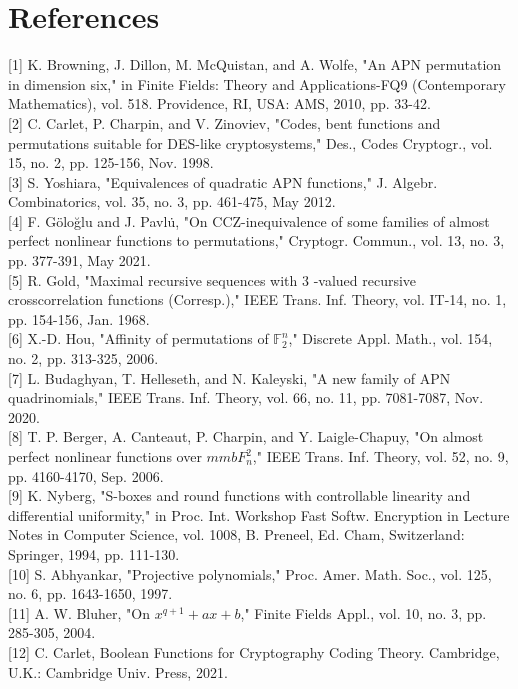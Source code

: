 \documentclass[10pt]{article}
\begin{document}
\section*{References}
[1] K. Browning, J. Dillon, M. McQuistan, and A. Wolfe, "An APN permutation in dimension six," in Finite Fields: Theory and Applications-FQ9 (Contemporary Mathematics), vol. 518. Providence, RI, USA: AMS, 2010, pp. 33-42.\\[0pt]
[2] C. Carlet, P. Charpin, and V. Zinoviev, "Codes, bent functions and permutations suitable for DES-like cryptosystems," Des., Codes Cryptogr., vol. 15, no. 2, pp. 125-156, Nov. 1998.\\[0pt]
[3] S. Yoshiara, "Equivalences of quadratic APN functions," J. Algebr. Combinatorics, vol. 35, no. 3, pp. 461-475, May 2012.\\[0pt]
[4] F. Göloğlu and J. Pavlu̇, "On CCZ-inequivalence of some families of almost perfect nonlinear functions to permutations," Cryptogr. Commun., vol. 13, no. 3, pp. 377-391, May 2021.\\[0pt]
[5] R. Gold, "Maximal recursive sequences with 3 -valued recursive crosscorrelation functions (Corresp.)," IEEE Trans. Inf. Theory, vol. IT-14, no. 1, pp. 154-156, Jan. 1968.\\[0pt]
[6] X.-D. Hou, "Affinity of permutations of $\mathbb{F}_{2}^{n}$," Discrete Appl. Math., vol. 154, no. 2, pp. 313-325, 2006.\\[0pt]
[7] L. Budaghyan, T. Helleseth, and N. Kaleyski, "A new family of APN quadrinomials," IEEE Trans. Inf. Theory, vol. 66, no. 11, pp. 7081-7087, Nov. 2020.\\[0pt]
[8] T. P. Berger, A. Canteaut, P. Charpin, and Y. Laigle-Chapuy, "On almost perfect nonlinear functions over $m m b F_{n}^{2}$," IEEE Trans. Inf. Theory, vol. 52, no. 9, pp. 4160-4170, Sep. 2006.\\[0pt]
[9] K. Nyberg, "S-boxes and round functions with controllable linearity and differential uniformity," in Proc. Int. Workshop Fast Softw. Encryption in Lecture Notes in Computer Science, vol. 1008, B. Preneel, Ed. Cham, Switzerland: Springer, 1994, pp. 111-130.\\[0pt]
[10] S. Abhyankar, "Projective polynomials," Proc. Amer. Math. Soc., vol. 125, no. 6, pp. 1643-1650, 1997.\\[0pt]
[11] A. W. Bluher, "On $x^{q+1}+a x+b$," Finite Fields Appl., vol. 10, no. 3, pp. 285-305, 2004.\\[0pt]
[12] C. Carlet, Boolean Functions for Cryptography Coding Theory. Cambridge, U.K.: Cambridge Univ. Press, 2021.\\[0pt]
\end{document}
